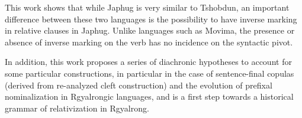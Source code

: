 \documentclass[oldfontcommands,oneside,a4paper,11pt]{article}
\begin{document}
This work shows that while Japhug is very similar to Tshobdun, an important difference between these two languages is the possibility to have inverse marking in relative clauses in Japhug. Unlike languages such as Movima, the presence or absence of inverse marking on the verb has no incidence on the syntactic pivot. 

 In addition, this work proposes a series of diachronic hypotheses to account for some particular constructions, in particular in the case of sentence-final copulas (derived from re-analyzed cleft construction) and the evolution of prefixal nominalization in Rgyalrongic languages, and is a first step towards a historical grammar of relativization in Rgyalrong.



\end{document}
